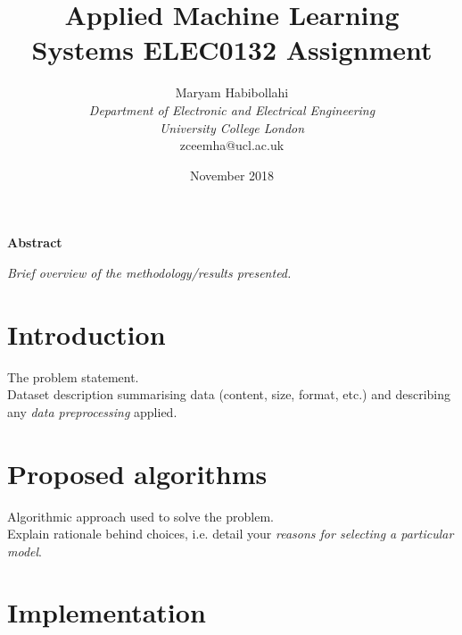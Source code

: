 \documentclass[conference]{IEEEtran}
\begin{document}
\title{Applied Machine Learning\\
 Systems ELEC0132 Assignment}
\author{\large Maryam Habibollahi\\ \textit{Department of Electronic and Electrical Engineering}\\ \textit{University College London}\\ zceemha@ucl.ac.uk}
\date{November 2018}
\maketitle

\setcounter{page}{1} 

\begin{center} \large \textbf{Abstract} \end{center}
\textit{Brief overview of the methodology/results presented.}\\

\section{Introduction} \label{s-intro}

The problem statement.\\

Dataset description summarising data (content, size, format, etc.) and describing any \textit{data preprocessing} applied.\\

\section{Proposed algorithms} \label{s-algorithms}

Algorithmic approach used to solve the problem.\\

Explain rationale behind choices, i.e. detail your \textit{reasons for selecting a particular model}.\\

\section{Implementation} \label{s-implement}
\end{document}
